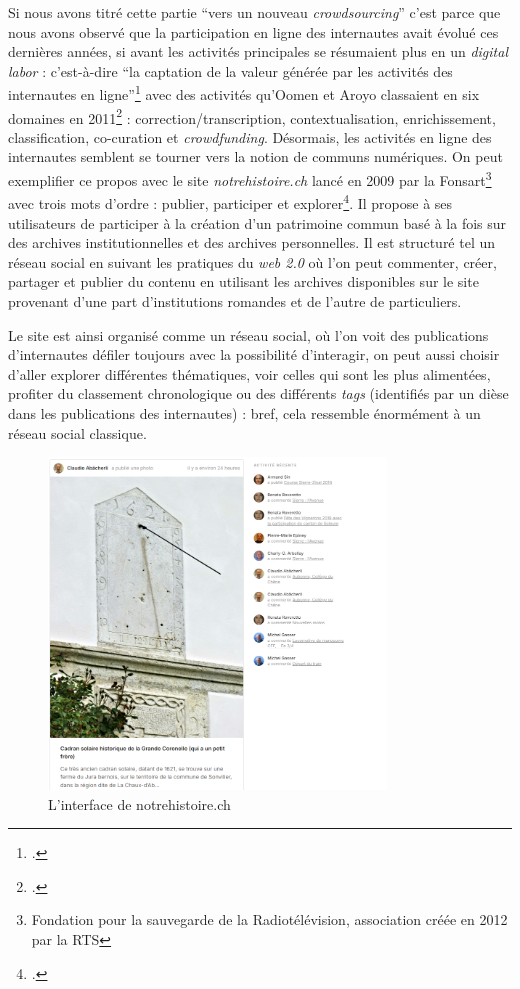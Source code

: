Si nous avons titré cette partie \enquote{vers un nouveau \textit{crowdsourcing}} c’est parce que nous avons observé que la participation en ligne des internautes avait évolué ces dernières années, si avant les activités principales se résumaient plus en un \textit{digital labor} : c’est-à-dire \enquote{la captation de la valeur générée par les activités des internautes en ligne}\footcite{zotero-365} avec des activités qu’Oomen et Aroyo classaient en six domaines en 2011\footcite[(cité par)]{neroulidis_crowdsourcing_2015} : correction/transcription, contextualisation, enrichissement, classification, co-curation et \textit{crowdfunding}. Désormais, les activités en ligne des internautes semblent se tourner vers la notion de communs numériques. On peut exemplifier ce propos avec le site \textit{notrehistoire.ch} lancé en 2009 par la Fonsart\footnote{Fondation pour la sauvegarde de la Radiotélévision, association créée en 2012 par la RTS} avec trois mots d’ordre : publier, participer et explorer\footcite{zotero-361}. Il propose à ses utilisateurs de participer à la création d’un patrimoine commun basé à la fois sur des archives institutionnelles et des archives personnelles. Il est structuré tel un réseau social en suivant les pratiques du \textit{web 2.0} où l’on peut commenter, créer, partager et publier du contenu en utilisant les archives disponibles sur le site provenant d’une part d’institutions romandes et de l’autre de particuliers.  

Le site est ainsi organisé comme un réseau social, où l’on voit des publications d’internautes défiler toujours avec la possibilité d’interagir, on peut aussi choisir d’aller explorer différentes thématiques, voir celles qui sont les plus alimentées, profiter du classement chronologique ou des différents \textit{tags} (identifiés par un dièse dans les publications des internautes) : bref, cela ressemble énormément à un réseau social classique.



\begin{figure}[h!]
	\centering
	\includegraphics[width=0.8\textwidth]{images/image22.png}
	\caption{L'interface de notrehistoire.ch}
	\label{fig:image21}
\end{figure}

